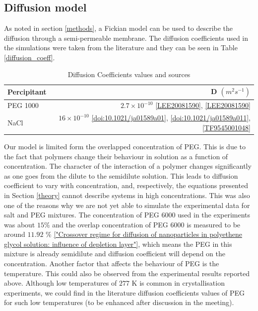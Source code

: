 \documentclass[11ptm,oneside,a4paper]{report}
\begin{document}
\subsection{Diffusion model}
    
    As noted in section \ref{methods}, a Fickian model can be used to describe the diffusion through a semi-permeable membrane. The diffusion coefficients used in the simulations were taken from the literature and they can be seen in Table \ref{diffusion_coeff}. 

    \begin{table}[h!]
          \begin{center}
            \caption{Diffusion Coefficients values and sources \label{diffusion_coeff}}
            \label{tab:table1}
            \begin{tabular}{l|r} %
              \textbf{Percipitant} & \textbf{D $(m^2s^{-1})$} \\
              \hline
              PEG 1000 & $2.7 \times 10^{-10}  $  \ref{LEE20081590}, 
              \ref{LEE20081590} \\
              NaCl & $16 \times 10^{-10} $ \ref{doi:10.1021/ja01589a01}, \ref{doi:10.1021/ja01589a011}, \ref{TF9545001048} \\
            \end{tabular}
          \end{center}
    \end{table}

    Our model is limited form the overlapped concentration of PEG. This is due to the fact that polymers change their behaviour in solution as a function of concentration. The character of the interaction of a polymer changes significantly as one goes from the dilute to the semidilute solution. This leads to diffusion coefficient to vary with concentration, and, respectively, the equations presented in Section \ref{theory} cannot describe systems in high concentrations. This was also one of the reasons why we are not yet able to simulate the experimental data for salt and PEG mixtures. The concentration of PEG 6000 used in the experiments was about $15$\% and the 
    overlap concentration of PEG 6000 is measured to be around $11.92$ \% \ref{"Crossover regime for diffusion of nanoparticles in polyethene glycol solution: influence of depletion layer"}, which means the PEG in this mixture is already semidilute and
    diffusion coefficient will depend on the concentration. Another factor that affects the behaviour of PEG is the temperature. 
    This could also be observed from the experimental results reported above. Although low temperatures of $277$ K is common in crystallisation experiments, we could find in the literature diffusion coefficients values of PEG for such low temperatures (to be enhanced after discussion in the meeting). 
\end{document}
